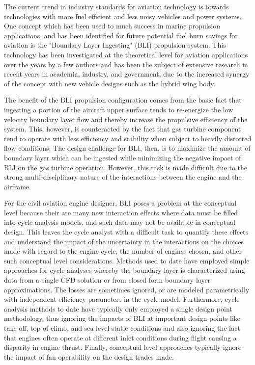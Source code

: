 \begin{summary}

\indent The current trend in industry standards for aviation technology is towards technologies with more fuel efficient and less noisy vehicles and power systems. One concept which has been used to much success in marine propulsion applications, and has been identified for future potential fuel burn savings for aviation is the "Boundary Layer Ingesting" (BLI) propulsion system.  This technology has been investigated at the theoretical level for aviation applications over the years by a few authors and has been the subject of extensive research in recent years in academia, industry, and government, due to the increased synergy of the concept with new vehicle designs such as the hybrid wing body.  

\indent The benefit of the BLI propulsion configuration comes from the basic fact that ingesting a portion of the aircraft upper surface tends to re-energize the low velocity boundary layer flow and thereby increase the propulsive efficiency of the system.  This, however, is counteracted by the fact that gas turbine component tend to operate with less efficiency and stability when subject to heavily distorted flow conditions.  The design challenge for BLI, then, is to maximize the amount of boundary layer which can be ingested while minimizing the negative impact of BLI on the gas turbine operation.  However, this task is made difficult due to the strong multi-disciplinary nature of the interactions between the engine and the airframe.

\indent  For the civil aviation engine designer, BLI poses a problem at the conceptual level because their are many new interaction effects where data must be filled into cycle analysis models, and such data may not be available in conceptual design.  This leaves the cycle analyst with a difficult task to quantify these effects and understand the impact of the uncertainty in the interactions on the choices made with regard to the engine cycle, the number of engines chosen, and other such conceptual level considerations.  Methods used to date have employed simple approaches for cycle analyses whereby the boundary layer is characterized using data from a single CFD solution or from closed form boundary layer approximations.  The losses are sometimes ignored, or are modeled parametrically with independent efficiency parameters in the cycle model.  Furthermore, cycle analysis methods to date have typically only employed a single design point methodology, thus ignoring the impacts of BLI at important design points like take-off, top of climb, and sea-level-static conditions and also ignoring the fact that engines often operate at different inlet conditions during flight causing a disparity in engine thrust.  Finally, conceptual level approaches typically ignore the impact of fan operability on the design trades made.


\end{summary}
